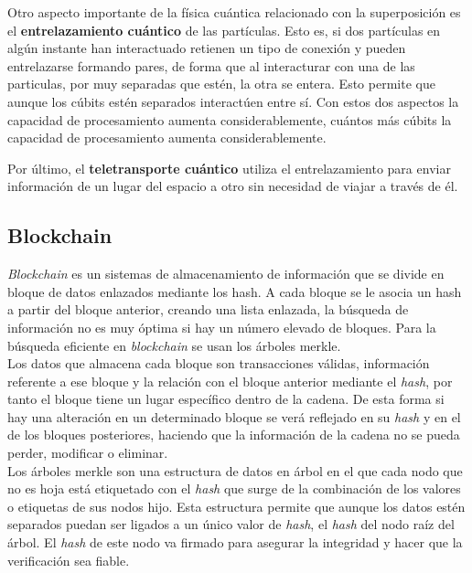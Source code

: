 Otro aspecto importante de la física cuántica relacionado con la superposición es el \textbf{entrelazamiento cuántico} de las partículas\cite{cumputacion-cuantica-clasica}. Esto es, si dos partículas en algún instante han interactuado retienen un tipo de conexión y pueden entrelazarse formando pares, de forma que al interacturar con una de las particulas, por muy separadas que estén, la otra se entera. Esto permite que aunque los cúbits estén separados interactúen entre sí. Con estos dos aspectos la capacidad de procesamiento aumenta considerablemente, cuántos más cúbits la capacidad de procesamiento aumenta considerablemente.

Por último, el \textbf{teletransporte cuántico} utiliza el entrelazamiento para enviar información de un lugar del espacio a otro sin necesidad de viajar a través de él.




\subsection{Blockchain}\label{sec:intro:blockchain}


\textit{Blockchain} es un sistemas de almacenamiento de información que se divide en bloque de datos enlazados mediante los hash. A cada bloque se le asocia un hash a partir del bloque anterior, creando una lista enlazada, la búsqueda de información no es muy óptima si hay un número elevado de bloques. Para la búsqueda eficiente en \textit{blockchain} se usan los árboles merkle.\\

Los datos que almacena cada bloque son transacciones válidas, información referente a ese bloque y la relación con el bloque anterior mediante el \textit{hash}, por tanto el bloque tiene un lugar específico dentro de la cadena. De esta forma si hay una alteración en un determinado bloque se verá reflejado en su \textit{hash} y en el de los bloques posteriores, haciendo que la información de la cadena no se pueda perder, modificar o eliminar.\\


Los árboles merkle \cite{arbol-merkle} son una estructura de datos en árbol en el que cada nodo que no es hoja está etiquetado con el \textit{hash} que surge de la combinación de los valores o etiquetas de sus nodos hijo. Esta estructura permite que aunque los datos estén separados puedan ser ligados a un único valor de \textit{hash}, el \textit{hash} del nodo raíz del árbol. El \textit{hash} de este nodo va firmado para asegurar la integridad y hacer que la verificación sea fiable. 

